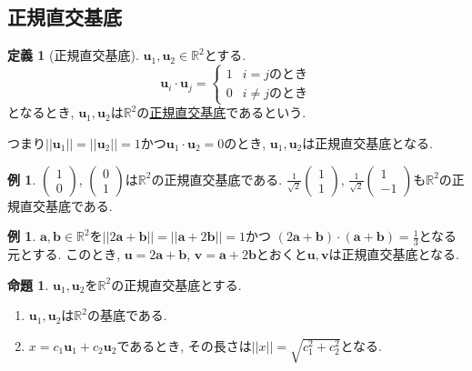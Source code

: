 \documentclass[dvipdfmx,a4paper,11pt]{article}
\newcommand{\R}{\mathbb{R}}
\theoremstyle{definition}
\newtheorem{prop}[thm]{命題}
\newtheorem{dfn}[thm]{定義}
\newtheorem{exa}[thm]{例}
\begin{document}
 
 
 \subsection{正規直交基底}
 
   \begin{tcolorbox}[
    colback = white,
    colframe = green!35!black,
    fonttitle = \bfseries,
    breakable = true]
    \begin{dfn}[正規直交基底]
$\bm{u}_1, \bm{u}_2 \in \R^2$とする. 
$$
\bm{u}_i\cdot \bm{u}_j =
\left\{
\begin{array}{ll}
1 & \text{$i=j$のとき} \\
0 & \text{$i\neq j$のとき}
\end{array}
\right.
$$
となるとき, $\bm{u}_1, \bm{u}_2 $は$\R^2$の\underline{正規直交基底}であるという. 
  \end{dfn}
 \end{tcolorbox}
 つまり$||\bm{u}_1|| =||\bm{u}_2|| =1$かつ$\bm{u}_1\cdot \bm{u}_2 =0$のとき, $\bm{u}_1, \bm{u}_2 $は正規直交基底となる.
 
 
 \begin{exa}
 $  \begin{pmatrix}
1 \\ 0
 \end{pmatrix}  
 $,
  $  \begin{pmatrix}
0 \\ 1
 \end{pmatrix}  
 $は$\R^2$の正規直交基底である.
 $  \frac{1}{\sqrt{2}}\begin{pmatrix}
1 \\ 1
 \end{pmatrix}  
 $,
  $  \frac{1}{\sqrt{2}}\begin{pmatrix}
1 \\ -1
 \end{pmatrix}  
 $も$\R^2$の正規直交基底である. 
 \end{exa}

 \begin{exa}
 $\bm{a}, \bm{b} \in \R^2$を$|| 2\bm{a}+\bm{b}|| =|| \bm{a}+2\bm{b}|| =1$かつ
 $(2\bm{a}+\bm{b})\cdot (\bm{a}+\bm{b})=\frac{1}{3}$となる元とする. 
 このとき, $\bm{u}=2\bm{a}+\bm{b}$, $\bm{v}=\bm{a}+2\bm{b}$とおくと$\bm{u}, \bm{v}$は正規直交基底となる. 
 \end{exa}



   \begin{tcolorbox}[
    colback = white,
    colframe = green!35!black,
    fonttitle = \bfseries,
    breakable = true]
    \begin{prop}
     $\bm{u}_1, \bm{u}_2 $を$\R^2$の正規直交基底とする.
  \begin{enumerate}
  \setlength{\parskip}{0cm}
 \setlength{\itemsep}{0pt} 
\item  $\bm{u}_1, \bm{u}_2 $は$\R^2$の基底である.
\item $x = c_1\bm{u}_1 + c_2\bm{u}_2$であるとき, その長さは$|| x ||=\sqrt{c_{1}^{2} + c_{2}^{2}}$となる. 
  \end{enumerate}
  \end{prop}
 \end{tcolorbox}
 
\end{document}
